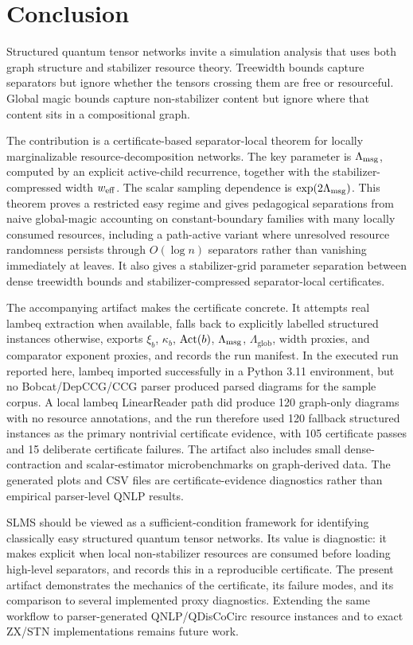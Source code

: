 \section{Conclusion}
\label{sec:conclusion}

Structured quantum tensor networks invite a simulation analysis that uses both graph structure and stabilizer resource theory. Treewidth bounds capture separators but ignore whether the tensors crossing them are free or resourceful. Global magic bounds capture non-stabilizer content but ignore where that content sits in a compositional graph.

The contribution is a certificate-based separator-local theorem for locally marginalizable resource-decomposition networks. The key parameter is \(\Lambda_{\mathrm{msg}}\), computed by an explicit active-child recurrence, together with the stabilizer-compressed width \(w_{\mathrm{eff}}\). The scalar sampling dependence is \(\exp(2\Lambda_{\mathrm{msg}})\). This theorem proves a restricted easy regime and gives pedagogical separations from naive global-magic accounting on constant-boundary families with many locally consumed resources, including a path-active variant where unresolved resource randomness persists through \(O(\log n)\) separators rather than vanishing immediately at leaves. It also gives a stabilizer-grid parameter separation between dense treewidth bounds and stabilizer-compressed separator-local certificates.

The accompanying artifact makes the certificate concrete. It attempts real lambeq extraction when available, falls back to explicitly labelled structured instances otherwise, exports \(\xi_b\), \(\kappa_b\), \(\operatorname{Act}(b)\), \(\Lambda_{\mathrm{msg}}\), \(\Lambda_{\mathrm{glob}}\), width proxies, and comparator exponent proxies, and records the run manifest. In the executed run reported here, lambeq imported successfully in a Python 3.11 environment, but no Bobcat/DepCCG/CCG parser produced parsed diagrams for the sample corpus. A local lambeq LinearReader path did produce 120 graph-only diagrams with no resource annotations, and the run therefore used 120 fallback structured instances as the primary nontrivial certificate evidence, with 105 certificate passes and 15 deliberate certificate failures. The artifact also includes small dense-contraction and scalar-estimator microbenchmarks on graph-derived data. The generated plots and CSV files are certificate-evidence diagnostics rather than empirical parser-level QNLP results.

SLMS should be viewed as a sufficient-condition framework for identifying classically easy structured quantum tensor networks. Its value is diagnostic: it makes explicit when local non-stabilizer resources are consumed before loading high-level separators, and records this in a reproducible certificate. The present artifact demonstrates the mechanics of the certificate, its failure modes, and its comparison to several implemented proxy diagnostics. Extending the same workflow to parser-generated QNLP/QDisCoCirc resource instances and to exact ZX/STN implementations remains future work.
